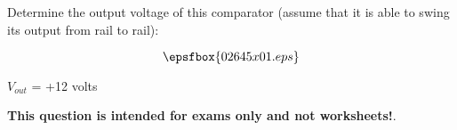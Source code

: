 

Determine the output voltage of this comparator (assume that it is able to swing its output from rail to rail):

$$\epsfbox{02645x01.eps}$$







$V_{out}$ = +12 volts







{\bf This question is intended for exams only and not worksheets!}.




